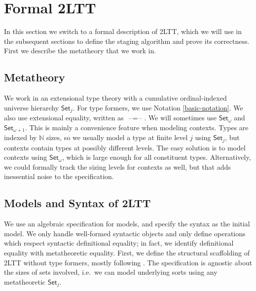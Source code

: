 \documentclass[acmsmall]{acmart}
\newcommand{\mbb}[1]{\mathbb{#1}}
\newcommand{\Set}{\mathsf{Set}}
\newcommand{\blank}{{\mathord{\hspace{1pt}\text{--}\hspace{1pt}}}}
\theoremstyle{remark}
\begin{document}
\section{Formal 2LTT}\label{sec:formal-2ltt}

In this section we switch to a formal description of 2LTT, which we will use in
the subsequent sections to define the staging algorithm and prove its
correctness. First we describe the metatheory that we work in.

\subsection{Metatheory} We work in an extensional type theory with
a cumulative ordinal-indexed universe hierarchy $\Set_j$. For type formers, we
use Notation \ref{basic-notation}. We also use extensional equality, written as
$\blank\!=\!\blank$. We will sometimes use $\Set_\omega$ and $\Set_{\omega+1}$.
This is mainly a convenience feature when modeling contexts. Types are indexed
by $\mbb{N}$ sizes, so we usually model a type at finite level $j$ using
$\Set_j$, but contexts contain types at possibly different levels. The easy
solution is to model contexts using $\Set_\omega$, which is large enough for all
constituent types. Alternatively, we could formally track the sizing levels for
contexts as well, but that adds inessential noise to the specification.

\subsection{Models and Syntax of 2LTT}
We use an algebraic specification for models, and specify the syntax as the
initial model. We only handle well-formed syntactic objects and only define
operations which respect syntactic definitional equality; in fact, we identify
definitional equality with metatheoretic equality. First, we define the
structural scaffolding of 2LTT without type formers, mostly following
\cite{twolevel}. The specification is agnostic about the sizes of sets involved,
i.e.\ we can model underlying sorts using any metatheoretic $\Set_j$.
\end{document}
